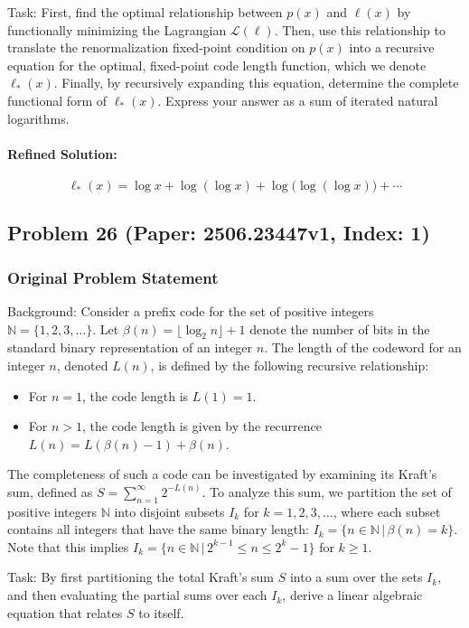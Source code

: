\documentclass[10pt]{article}
\begin{document}
Task:
First, find the optimal relationship between $p(x)$ and $\ell(x)$ by functionally minimizing the Lagrangian $\mathcal{L}(\ell)$. Then, use this relationship to translate the renormalization fixed-point condition on $p(x)$ into a recursive equation for the optimal, fixed-point code length function, which we denote $\ell_*(x)$. Finally, by recursively expanding this equation, determine the complete functional form of $\ell_*(x)$. Express your answer as a sum of iterated natural logarithms.

\paragraph*{Refined Solution:}
\[ \ell_*(x) = \log x + \log(\log x) + \log\bigl(\log(\log x)\bigr) + \cdots \]

\newpage
\subsection*{Problem 26 (Paper: 2506.23447v1, Index: 1)}

\subsubsection*{Original Problem Statement}
Background:
Consider a prefix code for the set of positive integers $\mathbb{N} = \{1, 2, 3, \ldots\}$. Let $\beta(n) = \lfloor \log_2 n \rfloor + 1$ denote the number of bits in the standard binary representation of an integer $n$. The length of the codeword for an integer $n$, denoted $L(n)$, is defined by the following recursive relationship:
\begin{itemize}
    \item For $n=1$, the code length is $L(1) = 1$.
    \item For $n > 1$, the code length is given by the recurrence $L(n) = L(\beta(n)-1) + \beta(n)$.
\end{itemize}
The completeness of such a code can be investigated by examining its Kraft's sum, defined as $S = \sum_{n=1}^{\infty} 2^{-L(n)}$. To analyze this sum, we partition the set of positive integers $\mathbb{N}$ into disjoint subsets $I_k$ for $k=1, 2, 3, \ldots$, where each subset contains all integers that have the same binary length: $I_k = \{ n \in \mathbb{N} \,|\, \beta(n) = k \}$. Note that this implies $I_k = \{ n \in \mathbb{N} \,|\, 2^{k-1} \leq n \leq 2^k - 1\}$ for $k \geq 1$.

Task:
By first partitioning the total Kraft's sum $S$ into a sum over the sets $I_k$, and then evaluating the partial sums over each $I_k$, derive a linear algebraic equation that relates $S$ to itself.
\end{document}
